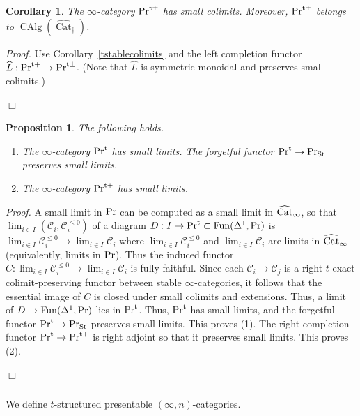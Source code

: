 \documentclass[leqno,12pt]{amsart}
\theoremstyle{plain}
\newtheorem{Proposition}[Theorem]{Proposition}
\newtheorem{Corollary}[Theorem]{Corollary}
\theoremstyle{definition}
\newcommand{\CCC}{\mathcal{C}}
\newcommand{\PR}{\textup{Pr}}
\newcommand{\PRT}{\textup{Pr}^{\textup{t}}}
\newcommand{\PRTT}{\textup{Pr}^{\textup{t}+}}
\newcommand{\PRTTT}{\textup{Pr}^{\textup{t}\pm}}
\newcommand{\Fun}{\operatorname{Fun}}
\newcommand{\wCat}{\widehat{\textup{Cat}}_{\infty}}
\newcommand{\CAlg}{\operatorname{CAlg}}
\newcommand{\vCat}{\widehat{\operatorname{Cat}}_\dagger}
\newcommand{\PRST}{\PR_{\textup{St}}}
\newcommand{\Proof}{{\sl Proof.}\quad}
\newcommand{\QED}{{\unskip\nobreak\hfil\penalty50\quad\null\nobreak\hfil
{$\Box$}\parfillskip0pt\finalhyphendemerits0\par\medskip}}
\begin{document}
\begin{Corollary}
\label{tstablecolimits2}
The $\infty$-category $\PRTTT$ has small colimits.
Moreover, $\PRTTT$ belongs to $\CAlg(\vCat)$.
\end{Corollary}


\Proof
Use Corollary~\ref{tstablecolimits} and the left completion functor $\widehat{L}:\PRTT\to \PRTTT$.
(Note that $\widehat{L}$ is symmetric monoidal and preserves small colimits.)
\QED





\begin{Proposition}
\label{PRTcolimitlimit}
The following holds.
\begin{enumerate}

\item The $\infty$-category $\PRT$ has small limits. The forgetful functor $\PRT\to \PRST$ preserves small limits.

\item The $\infty$-category $\PRTT$ has small limits.

\end{enumerate}
\end{Proposition}


\Proof
A small limit in $\PR$ can be computed as a small limit in $\wCat$,
so that $\lim_{i\in I}(\CCC_i,\CCC_i^{\le0})$ of a diagram $D:I\to \PRT\subset \Fun(\Delta^1,\PR)$
is $\lim_{i\in I}\CCC_i^{\le0}\to \lim_{i\in I}\CCC_i$
where $\lim_{i\in I}\CCC_i^{\le0}$ and $\lim_{i\in I}\CCC_i$ are limits in $\wCat$ (equivalently, limits in $\PR$).
Thus the induced functor $C:\lim_{i\in I}\CCC_i^{\le0}\to \lim_{i\in I}\CCC_i$
is fully faithful. Since each $\CCC_i\to \CCC_j$ is a right $t$-exact colimit-preserving functor between stable $\infty$-categories,
it follows that the essential image of $C$ is closed under small colimits and extensions.
Thus, a limit of $D\to \Fun(\Delta^1,\PR)$ lies in $\PRT$. Thus, $\PRT$ has small limits,
and 
the forgetful functor $\PRT\to \PRST$ preserves small limits. This proves (1).
The right completion functor $\PRT\to \PRTT$ is right adjoint so that it preserves small limits. This proves (2). 
\QED




\subsubsection{}
We define $t$-structured presentable $(\infty,n)$-categories.
\end{document}
